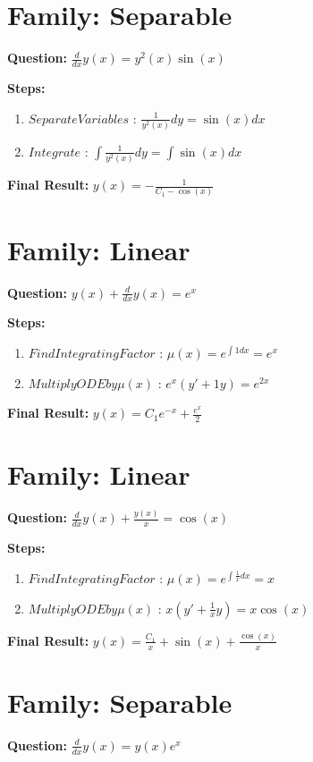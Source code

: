 \documentclass{article}
\begin{document}
\section*{Family: Separable}
\textbf{Question:} $\frac{d}{d x} y{\left(x \right)} = y^{2}{\left(x \right)} \sin{\left(x \right)}$

\textbf{Steps:}
\begin{enumerate}
\item $Separate Variables$ :  $\frac{1}{y^{2}{\left(x \right)}} dy = \sin{\left(x \right)} dx$
\item $Integrate$ :  $\int \frac{1}{y^{2}{\left(x \right)}} dy = \int \sin{\left(x \right)} dx$
\end{enumerate}
\textbf{Final Result:} $y{\left(x \right)} = - \frac{1}{C_{1} - \cos{\left(x \right)}}$

\section*{Family: Linear}
\textbf{Question:} $y{\left(x \right)} + \frac{d}{d x} y{\left(x \right)} = e^{x}$

\textbf{Steps:}
\begin{enumerate}
\item $Find Integrating Factor$ :  $\mu(x) = e^{\int 1 dx} = e^{x}$
\item $Multiply ODE by \mu(x)$ :  $e^{x}(y' + 1y) = e^{2 x}$
\end{enumerate}
\textbf{Final Result:} $y{\left(x \right)} = C_{1} e^{- x} + \frac{e^{x}}{2}$

\section*{Family: Linear}
\textbf{Question:} $\frac{d}{d x} y{\left(x \right)} + \frac{y{\left(x \right)}}{x} = \cos{\left(x \right)}$

\textbf{Steps:}
\begin{enumerate}
\item $Find Integrating Factor$ :  $\mu(x) = e^{\int \frac{1}{x} dx} = x$
\item $Multiply ODE by \mu(x)$ :  $x(y' + \frac{1}{x}y) = x \cos{\left(x \right)}$
\end{enumerate}
\textbf{Final Result:} $y{\left(x \right)} = \frac{C_{1}}{x} + \sin{\left(x \right)} + \frac{\cos{\left(x \right)}}{x}$

\section*{Family: Separable}
\textbf{Question:} $\frac{d}{d x} y{\left(x \right)} = y{\left(x \right)} e^{x}$
\end{document}
